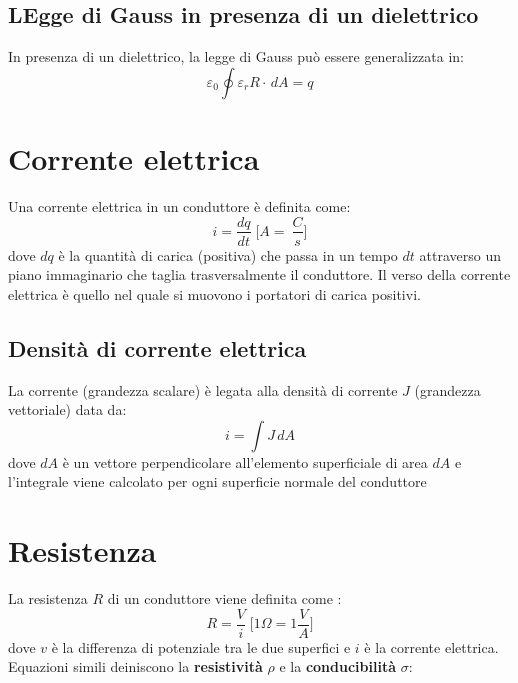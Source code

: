         \subsection{LEgge di Gauss in presenza di un dielettrico} In presenza 
        di un dielettrico, la legge di Gauss può essere generalizzata in:
            \begin{equation}
                \varepsilon_0 \oint \varepsilon_rR\cdot\,dA = q
            \end{equation}

    \section{Corrente elettrica} Una corrente elettrica in un conduttore è 
    definita come:
        \begin{equation}
            i = \frac{dq}{dt} \; \Bigg[A = \ \frac{C}{s}\Bigg]
        \end{equation}
    dove $dq$ è la quantità di carica (positiva) che passa in un tempo $dt$ 
    attraverso un piano immaginario che taglia trasversalmente il conduttore.
    Il verso della corrente elettrica è quello nel quale si muovono i portatori
    di carica positivi. 

        \subsection{Densità di corrente elettrica} La corrente (grandezza 
        scalare) è legata alla densità di corrente $J$ (grandezza vettoriale) 
        data da:
            \begin{equation}
                i = \int J \, dA
            \end{equation}
        dove $dA$ è un vettore perpendicolare all'elemento superficiale di area
        $dA$ e l'integrale viene calcolato per ogni superficie normale del 
        conduttore
        
    \section{Resistenza} La resistenza $R$ di un conduttore viene definita come
    :
        \begin{equation}
            R = \frac{V}{i} \; \Bigg[1 \Omega = 1 \frac{V}{A}\Bigg]        
        \end{equation}
    dove $v$ è la differenza di potenziale tra le due superfici e $i$ è la 
    corrente elettrica. Equazioni simili deiniscono la \textbf{resistività} 
    $\rho$ e la \textbf{conducibilità} $\sigma$:
        
